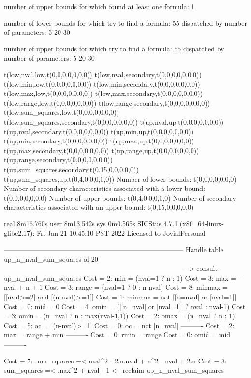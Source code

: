 number of upper bounds for which found at least one formula: 1

number of lower bounds for which try to find a formula: 55
dispatched by number of parameters: 5  20  30

number of upper bounds for which try to find a formula: 55
dispatched by number of parameters: 5  20  30

t(low,nval,low,t(0,0,0,0,0,0,0))
t(low,nval,secondary,t(0,0,0,0,0,0,0))
t(low,min,low,t(0,0,0,0,0,0,0))
t(low,min,secondary,t(0,0,0,0,0,0,0))
t(low,max,low,t(0,0,0,0,0,0,0))
t(low,max,secondary,t(0,0,0,0,0,0,0))
t(low,range,low,t(0,0,0,0,0,0,0))
t(low,range,secondary,t(0,0,0,0,0,0,0))
t(low,sum_squares,low,t(0,0,0,0,0,0,0))
t(low,sum_squares,secondary,t(0,0,0,0,0,0,0))
t(up,nval,up,t(0,0,0,0,0,0,0))
t(up,nval,secondary,t(0,0,0,0,0,0,0))
t(up,min,up,t(0,0,0,0,0,0,0))
t(up,min,secondary,t(0,0,0,0,0,0,0))
t(up,max,up,t(0,0,0,0,0,0,0))
t(up,max,secondary,t(0,0,0,0,0,0,0))
t(up,range,up,t(0,0,0,0,0,0,0))
t(up,range,secondary,t(0,0,0,0,0,0,0))
t(up,sum_squares,secondary,t(0,15,0,0,0,0,0))
t(up,sum_squares,up,t(0,4,0,0,0,0,0))
Number of lower bounds:                                             t(0,0,0,0,0,0,0)
Number of secondary characteristics associated with a lower bound:  t(0,0,0,0,0,0,0)
Number of upper bounds:                                             t(0,4,0,0,0,0,0)
Number of secondary characteristics associated with an upper bound: t(0,15,0,0,0,0,0)

real	8m16.760s
user	8m13.542s
sys	0m0.565s
SICStus 4.7.1 (x86_64-linux-glibc2.17): Fri Jan 21 10:45:10 PST 2022
Licensed to JovialPersonal


--------------------------------------------------------------------------------
Handle table up_n_nval_sum_squares of 20
--------------------------------------------------------------------------------
--> consult up_n_nval_sum_squares
Cost =  2:  min    = (nval=1 ? n : 1)
Cost =  3:  max    = -nval + n + 1
Cost =  3:  range  = (nval=1 ? 0 : n-nval)
Cost =  8:  minmax = [[nval>=2] and [(n-nval)>=1]]
Cost =  1:  minmax = not [[n=nval] or [nval=1]]
Cost =  0:  mid    = 0
Cost =  4:  omin   = ([[n=nval] or [nval=1]] ? nval : nval-1)
Cost =  3:  omin   = (n=nval ? n : max(nval-1,1))
Cost =  2:  omax   = (n=nval ? n : 1)
Cost =  5:  oc     = [(n-nval)>=1]
Cost =  0:  oc     = not [n=nval]
----------
Cost =  2:  max    = range + min
----------
Cost =  0:  rmin   = range
Cost =  0:  omid   = mid
----------

Cost =  7:  sum_squares =< nval^2 - 2.n.nval + n^2 - nval + 2.n
Cost =  3:  sum_squares =< max^2 + nval - 1
<-- reclaim up_n_nval_sum_squares

